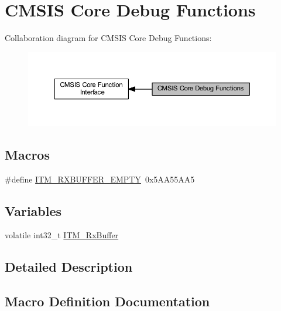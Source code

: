 \hypertarget{group___c_m_s_i_s__core___debug_functions}{}\section{C\+M\+S\+IS Core Debug Functions}
\label{group___c_m_s_i_s__core___debug_functions}
Collaboration diagram for C\+M\+S\+IS Core Debug Functions\+:\nopagebreak
\begin{figure}[H]
\begin{center}
\leavevmode
\includegraphics[width=350pt]{group___c_m_s_i_s__core___debug_functions}
\end{center}
\end{figure}
\subsection*{Macros}
\begin{DoxyCompactItemize}
\item 
\#define \hyperlink{group___c_m_s_i_s__core___debug_functions_gaa822cb398ee022b59e9e6c5d7bbb228a}{I\+T\+M\+\_\+\+R\+X\+B\+U\+F\+F\+E\+R\+\_\+\+E\+M\+P\+TY}~0x5\+A\+A55\+A\+A5
\end{DoxyCompactItemize}
\subsection*{Variables}
\begin{DoxyCompactItemize}
\item 
volatile int32\+\_\+t \hyperlink{group___c_m_s_i_s__core___debug_functions_ga12e68e55a7badc271b948d6c7230b2a8}{I\+T\+M\+\_\+\+Rx\+Buffer}
\end{DoxyCompactItemize}


\subsection{Detailed Description}


\subsection{Macro Definition Documentation}
\mbox{\label{group___c_m_s_i_s__core___debug_functions_gaa822cb398ee022b59e9e6c5d7bbb228a}} 
